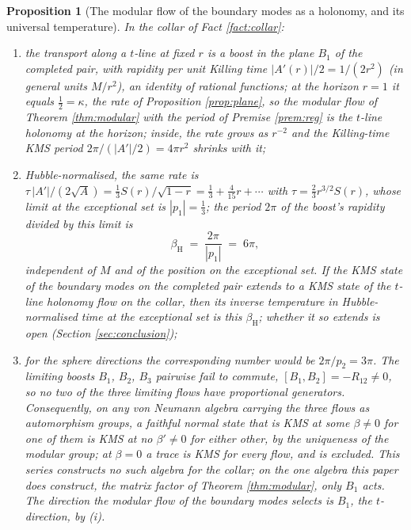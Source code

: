 \documentclass[11pt]{article}
\newtheorem{proposition}[theorem]{Proposition}
\theoremstyle{definition}
\begin{document}
\begin{proposition}[The modular flow of the boundary modes as a holonomy, and its universal temperature]\label{prop:holonomy}
In the collar of Fact \ref{fact:collar}:
\begin{enumerate}
\item[(i)] the transport along a $t$-line at fixed $r$ is a boost in the plane $B_1$ of the completed pair, with rapidity per unit Killing time $|A'(r)|/2 = 1/(2r^2)$ (in general units $M/r^2$), an identity of rational functions; at the horizon $r = 1$ it equals $\tfrac12 = \kappa$, the rate of Proposition \ref{prop:plane}, so the modular flow of Theorem \ref{thm:modular} with the period of Premise \ref{prem:reg} is the $t$-line holonomy at the horizon; inside, the rate grows as $r^{-2}$ and the Killing-time KMS period $2\pi/(|A'|/2) = 4\pi r^2$ shrinks with it;
\item[(ii)] Hubble-normalised, the same rate is $\tau\,|A'|/(2\sqrt{A}) = \tfrac13 S(r)/\sqrt{1 - r} = \tfrac13 + \tfrac{4}{15}r + \cdots$ with $\tau = \tfrac23 r^{3/2} S(r)$, whose limit at the exceptional set is $|p_1| = \tfrac13$; the period $2\pi$ of the boost's rapidity divided by this limit is
\[
\beta_{\mathrm{H}} \;=\; \frac{2\pi}{|p_1|} \;=\; 6\pi ,
\]
independent of $M$ and of the position on the exceptional set. If the KMS state of the boundary modes on the completed pair extends to a KMS state of the $t$-line holonomy flow on the collar, then its inverse temperature in Hubble-normalised time at the exceptional set is this $\beta_{\mathrm{H}}$; whether it so extends is open (Section \ref{sec:conclusion});
\item[(iii)] for the sphere directions the corresponding number would be $2\pi/p_2 = 3\pi$. The limiting boosts $B_1$, $B_2$, $B_3$ pairwise fail to commute, $[B_1, B_2] = -R_{12} \neq 0$, so no two of the three limiting flows have proportional generators. Consequently, on any von Neumann algebra carrying the three flows as automorphism groups, a faithful normal state that is KMS at some $\beta \neq 0$ for one of them is KMS at no $\beta' \neq 0$ for either other, by the uniqueness of the modular group; at $\beta = 0$ a trace is KMS for every flow, and is excluded. This series constructs no such algebra for the collar; on the one algebra this paper does construct, the matrix factor of Theorem \ref{thm:modular}, only $B_1$ acts. The direction the modular flow of the boundary modes selects is $B_1$, the $t$-direction, by (i).
\end{enumerate}
\end{proposition}
\end{document}
